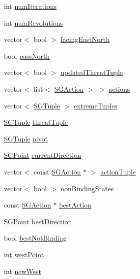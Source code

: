 \begin{DoxyCompactItemize}
\item 
int \hyperlink{class_s_g_approximation_a2898a820d159794c48e5611ee3937ca8}{num\+Iterations}
\item 
int \hyperlink{class_s_g_approximation_a9772bd4fa2add763f1177f87149c5d07}{num\+Revolutions}
\item 
vector$<$ bool $>$ \hyperlink{class_s_g_approximation_a35e422ed70d04b22ea8719cbc0f2fb6a}{facing\+East\+North}
\item 
bool \hyperlink{class_s_g_approximation_a054de05172362fe53f74488e9ab5a026}{pass\+North}
\item 
vector$<$ bool $>$ \hyperlink{class_s_g_approximation_afb83095fff0f02df719ed3654abab5a8}{updated\+Threat\+Tuple}
\item 
vector$<$ list$<$ \hyperlink{class_s_g_action}{S\+G\+Action} $>$ $>$ \hyperlink{class_s_g_approximation_abd29fc968e004b53a2d59702657a2b70}{actions}
\item 
vector$<$ \hyperlink{class_s_g_tuple}{S\+G\+Tuple} $>$ \hyperlink{class_s_g_approximation_ac55fd302328ae8fbe4d1f8cf24a7ba32}{extreme\+Tuples}
\item 
\hyperlink{class_s_g_tuple}{S\+G\+Tuple} \hyperlink{class_s_g_approximation_aee3bab15aee351f8a543df2799f2c9f6}{threat\+Tuple}
\item 
\hyperlink{class_s_g_tuple}{S\+G\+Tuple} \hyperlink{class_s_g_approximation_ad7e37739a8b457ebe4a1c1e32bf9ca6c}{pivot}
\item 
\hyperlink{class_s_g_point}{S\+G\+Point} \hyperlink{class_s_g_approximation_a603408048cb6c1a13078c27a017e8202}{current\+Direction}
\item 
vector$<$ const \hyperlink{class_s_g_action}{S\+G\+Action} $\ast$ $>$ \hyperlink{class_s_g_approximation_a70b2b3ee6577efd50e7cbe49b464f232}{action\+Tuple}
\item 
vector$<$ bool $>$ \hyperlink{class_s_g_approximation_a42b53c0e82dfa456f3153bcc79185dcd}{non\+Binding\+States}
\item 
const \hyperlink{class_s_g_action}{S\+G\+Action} $\ast$ \hyperlink{class_s_g_approximation_ab2a6d6ed6880fb4cbc05e671b6b6673a}{best\+Action}
\item 
\hyperlink{class_s_g_point}{S\+G\+Point} \hyperlink{class_s_g_approximation_a1dd4f78e0789e61ee5c467afc403fc6d}{best\+Direction}
\item 
bool \hyperlink{class_s_g_approximation_a3f55b0a9fb9f8e2c3ae6949bc8fd046c}{best\+Not\+Binding}
\item 
int \hyperlink{class_s_g_approximation_ad64f17c049fda984e3f4e955a372a9d6}{west\+Point}
\item 
int \hyperlink{class_s_g_approximation_a82f819dc38d837e69d60225823a64671}{new\+West}
\end{DoxyCompactItemize}
